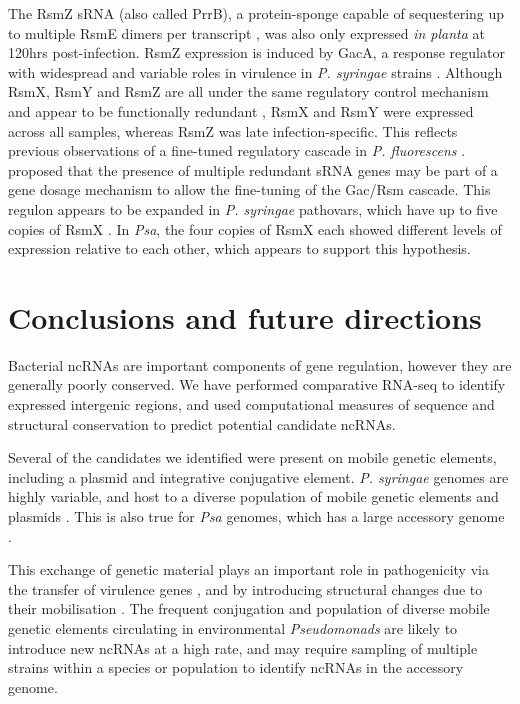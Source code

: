 The RsmZ sRNA (also called PrrB), a protein-sponge capable of sequestering up to multiple RsmE dimers per transcript \citep{Duss2014-rs}, was also only expressed \textit{in planta} at 120hrs post-infection. RsmZ expression is induced by GacA, a response regulator with widespread and variable roles in virulence in \textit{P. syringae} strains \citep{Chatterjee2003-ri}. Although RsmX, RsmY and RsmZ are all under the same regulatory control mechanism and appear to be functionally redundant \citep{Moll2010-lt}, RsmX and RsmY were expressed across all samples, whereas RsmZ was late infection-specific. This reflects previous observations of a fine-tuned regulatory cascade in \textit{P. fluorescens} \citep{Kay2005-gv}. \cite{Kay2005-gv} proposed that the presence of multiple redundant sRNA genes may be part of a gene dosage mechanism to allow the fine-tuning of the Gac/Rsm cascade. This regulon appears to be expanded in \textit{P. syringae} pathovars, which have up to five copies of RsmX \citep{Moll2010-lt}. In \textit{Psa}, the four copies of RsmX each showed different levels of expression relative to each other, which appears to support this hypothesis.

\section{Conclusions and future directions}

Bacterial ncRNAs are important components of gene regulation, however they are generally poorly conserved. We have performed comparative RNA-seq to identify expressed intergenic regions, and used computational measures of sequence and structural conservation to predict potential candidate ncRNAs. 

Several of the candidates we identified were present on mobile genetic elements, including a plasmid and integrative conjugative element. \textit{P. syringae} genomes are highly variable, and host to a diverse population of mobile genetic elements and plasmids \citep{Bardaji2011-jc,Gutierrez-Barranquero2017-id, Colombi2017-yxxf}. This is also true for \textit{Psa} genomes, which has a large accessory genome \citep{McCann2017-xjvkhy}.

This exchange of genetic material plays an important role in pathogenicity via the transfer of virulence genes \citep{Melnyk2019-lx}, and by introducing structural changes due to their mobilisation \citep{Jackson2011-vd,Baltrus2017-xjkkk}. The frequent conjugation and population of diverse mobile genetic elements circulating in environmental \textit{Pseudomonads} are likely to introduce new ncRNAs at a high rate, and may require sampling of multiple strains within a species or population to identify ncRNAs in the accessory genome.

